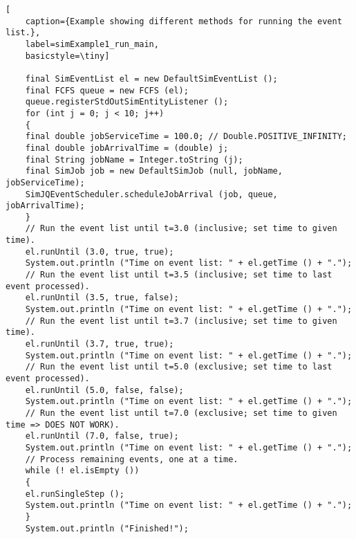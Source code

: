 \begin{lstfloat}
	\begin{lstlisting}[
	caption={Example showing different methods for running the event list.},
	label=simExample1_run_main,
	basicstyle=\tiny]
	
	final SimEventList el = new DefaultSimEventList ();
	final FCFS queue = new FCFS (el);
	queue.registerStdOutSimEntityListener ();
	for (int j = 0; j < 10; j++)
	{
	final double jobServiceTime = 100.0; // Double.POSITIVE_INFINITY;
	final double jobArrivalTime = (double) j;
	final String jobName = Integer.toString (j);
	final SimJob job = new DefaultSimJob (null, jobName, jobServiceTime);
	SimJQEventScheduler.scheduleJobArrival (job, queue, jobArrivalTime);
	}
	// Run the event list until t=3.0 (inclusive; set time to given time).
	el.runUntil (3.0, true, true);
	System.out.println ("Time on event list: " + el.getTime () + ".");
	// Run the event list until t=3.5 (inclusive; set time to last event processed).
	el.runUntil (3.5, true, false);
	System.out.println ("Time on event list: " + el.getTime () + ".");
	// Run the event list until t=3.7 (inclusive; set time to given time).
	el.runUntil (3.7, true, true);
	System.out.println ("Time on event list: " + el.getTime () + ".");
	// Run the event list until t=5.0 (exclusive; set time to last event processed).
	el.runUntil (5.0, false, false);
	System.out.println ("Time on event list: " + el.getTime () + ".");
	// Run the event list until t=7.0 (exclusive; set time to given time => DOES NOT WORK).
	el.runUntil (7.0, false, true);
	System.out.println ("Time on event list: " + el.getTime () + ".");
	// Process remaining events, one at a time.
	while (! el.isEmpty ())
	{
	el.runSingleStep ();
	System.out.println ("Time on event list: " + el.getTime () + ".");
	}
	System.out.println ("Finished!");
	
	\end{lstlisting}
\end{lstfloat}

